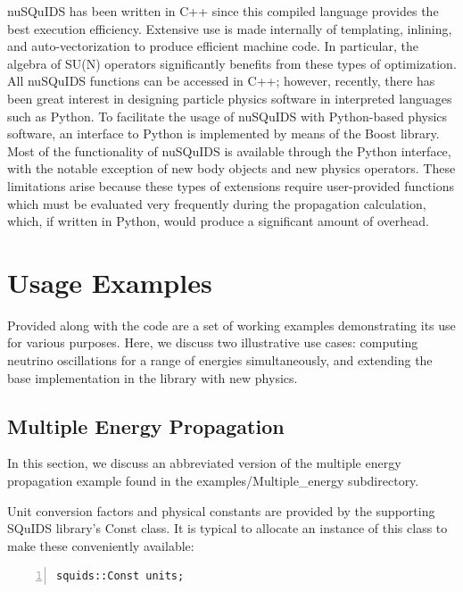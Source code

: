 \documentclass[3p,12pt]{elsarticle}
\newcommand{\ttf}{\ttfamily}
\begin{document}
{\ttf nuSQuIDS} has been written in {\ttf C++} since this compiled language provides the best execution efficiency. 
Extensive use is made internally of templating, inlining, and auto-vectorization to produce efficient machine code. 
In particular, the algebra of SU(N) operators significantly benefits from these types of optimization.
All {\ttf nuSQuIDS} functions can be accessed in {\ttf C++}; however, recently, there has been great interest in designing particle physics software in interpreted languages such as {\ttf Python}.
To facilitate the usage of {\ttf nuSQuIDS} with {\ttf Python}-based physics software, an interface to {\ttf Python} is implemented by means of the Boost library.
Most of the functionality of {\ttf nuSQuIDS} is available through the {\ttf Python} interface, with the notable exception of new body objects and new physics operators. 
These limitations arise because these types of extensions require user-provided functions which must be evaluated very frequently during the propagation calculation, which, if written in {\ttf Python}, would produce a significant amount of overhead.

\section{Usage Examples}
\label{sec:short_examples}
Provided along with the code are a set of working examples demonstrating its use for various purposes. 
Here, we discuss two illustrative use cases: computing neutrino oscillations for a range of energies simultaneously, and extending the base implementation in the library with new physics. 

\subsection{Multiple Energy Propagation}
In this section, we discuss an abbreviated version of the multiple energy propagation example found in the {\ttf examples/Multiple\_energy} subdirectory. 

Unit conversion factors and physical constants are provided by the supporting {\ttf SQuIDS} library's {\ttf Const} class. 
It is typical to allocate an instance of this class to make these conveniently available:

\begin{lstlisting}[frame=leftline, numbers = left,breaklines=true]
squids::Const units;
\end{lstlisting}
\end{document}
